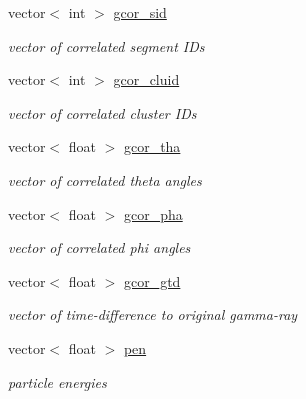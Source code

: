 \begin{DoxyCompactItemize}
\mbox{\label{classg__clx_a10ddb8a6039959138b145dec9979a216}} 
vector$<$ int $>$ \hyperlink{classg__clx_a10ddb8a6039959138b145dec9979a216}{gcor\+\_\+sid}
\begin{DoxyCompactList}\small\item\em vector of correlated segment I\+Ds \end{DoxyCompactList}\item 
\mbox{\label{classg__clx_a93666f6d2ee0818e554d9188df02b844}} 
vector$<$ int $>$ \hyperlink{classg__clx_a93666f6d2ee0818e554d9188df02b844}{gcor\+\_\+cluid}
\begin{DoxyCompactList}\small\item\em vector of correlated cluster I\+Ds \end{DoxyCompactList}\item 
\mbox{\label{classg__clx_a19c4bfa4d9f2d4ef26399075bba0c2d2}} 
vector$<$ float $>$ \hyperlink{classg__clx_a19c4bfa4d9f2d4ef26399075bba0c2d2}{gcor\+\_\+tha}
\begin{DoxyCompactList}\small\item\em vector of correlated theta angles \end{DoxyCompactList}\item 
\mbox{\label{classg__clx_a823ddd84f64de88789bfa434579778dc}} 
vector$<$ float $>$ \hyperlink{classg__clx_a823ddd84f64de88789bfa434579778dc}{gcor\+\_\+pha}
\begin{DoxyCompactList}\small\item\em vector of correlated phi angles \end{DoxyCompactList}\item 
\mbox{\label{classg__clx_a7a01f0832f4e7f7737179ddcc7b74b7b}} 
vector$<$ float $>$ \hyperlink{classg__clx_a7a01f0832f4e7f7737179ddcc7b74b7b}{gcor\+\_\+gtd}
\begin{DoxyCompactList}\small\item\em vector of time-\/difference to original gamma-\/ray \end{DoxyCompactList}\item 
\mbox{\label{classg__clx_a69177d2d636c68b6e20b26b3166421a0}} 
vector$<$ float $>$ \hyperlink{classg__clx_a69177d2d636c68b6e20b26b3166421a0}{pen}
\begin{DoxyCompactList}\small\item\em particle energies \end{DoxyCompactList}\item 

\end{DoxyCompactItemize}
